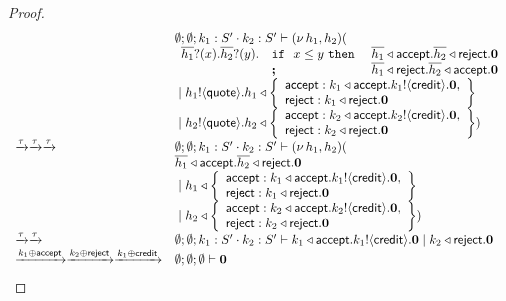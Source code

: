 \begin{proof}
\[\begin{array}{ll}
		& \emptyset; \emptyset; k_1: S' \cdot k_2: S' \vdash (\nu\, h_1, h_2)(\\
		&
		\begin{array}{lll}
			\overline{h_1} ? (x) . \overline{h_2} ? (y) . & \mathtt{if}\ \ x \leq y\ \mathtt{then}\  & \overline{h_1} \triangleleft \mathsf{accept} . \overline{h_2} \triangleleft \mathsf{reject} . \mathbf{0}\\
			& \boldsymbol{;}& \overline{h_1} \triangleleft \mathsf{reject} . \overline{h_2} \triangleleft \mathsf{accept} . \mathbf{0}
		\end{array}\\
		& \;|\; h_1 ! \langle \mathsf{quote} \rangle .
		h_1 \triangleleft \left\{
		\begin{array}{l}
			\mathsf{accept}: k_1 \triangleleft \mathsf{accept} . k_1 ! \langle \mathsf{credit} \rangle . \mathbf{0},\\
			\mathsf{reject}: k_1 \triangleleft \mathsf{reject} . \mathbf{0}
		\end{array}
		\right\} \\
		& \;|\;
		h_2 ! \langle \mathsf{quote} \rangle .
		h_2 \triangleleft \left\{
		\begin{array}{l}
			\mathsf{accept}: k_2 \triangleleft \mathsf{accept} . k_2 ! \langle \mathsf{credit} \rangle . \mathbf{0},\\
			\mathsf{reject}: k_2 \triangleleft \mathsf{reject} . \mathbf{0}
		\end{array}
		\right\} )
\\
		\xrightarrow{\tau} \xrightarrow{\tau} \xrightarrow{\tau}&
		\emptyset; \emptyset; k_1: S' \cdot k_2: S' \vdash (\nu\, h_1, h_2)(\\
		& \overline{h_1} \triangleleft \mathsf{accept} . \overline{h_2} \triangleleft \mathsf{reject} . \mathbf{0}\\
		& \;|\;
		h_1 \triangleleft \left\{
		\begin{array}{l}
			\mathsf{accept}: k_1 \triangleleft \mathsf{accept} . k_1 ! \langle \mathsf{credit} \rangle . \mathbf{0},\\
			\mathsf{reject}: k_1 \triangleleft \mathsf{reject} . \mathbf{0}
		\end{array}
		\right\} \\
		& \;|\;
		h_2 \triangleleft \left\{
		\begin{array}{l}
			\mathsf{accept}: k_2 \triangleleft \mathsf{accept} . k_2 ! \langle \mathsf{credit} \rangle . \mathbf{0},\\
			\mathsf{reject}: k_2 \triangleleft \mathsf{reject} . \mathbf{0}
		\end{array}
		\right\} )
\\
		\xrightarrow{\tau} \xrightarrow{\tau}&
		\emptyset; \emptyset; k_1: S' \cdot k_2: S' \vdash
		k_1 \triangleleft \mathsf{accept} . k_1 ! \langle \mathsf{credit} \rangle . \mathbf{0} 
		\;|\; k_2 \triangleleft \mathsf{reject} . \mathbf{0}
\\

		\xrightarrow{k_1 \oplus \mathsf{accept}} \xrightarrow{k_2 \oplus \mathsf{reject}} \xrightarrow{k_1 \oplus \mathsf{credit}}&
		\emptyset; \emptyset; \emptyset \vdash \mathbf{0}
	\end{array}
\]


\end{proof}
